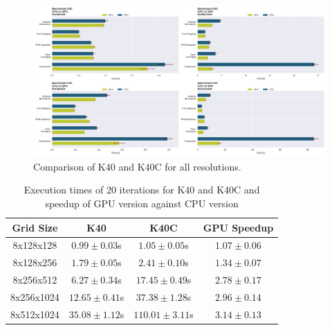 \documentclass[master.tex]{subfiles}
\begin{document}
\begin{figure}[!hbtp]
    \centering
    \includegraphics[width=\linewidth]{pdfs/k40CPUvsGPU_complete_means.pdf}
    \caption{\small Comparison of \ac{K40} and \ac{K40C} for all resolutions.}
    \label{fig:k40_gpu_vs_cpu_complete_means}
\end{figure}

\begin{table}[!hbtp]
    \centering
    \begin{tabular}{c|c|c|c}
        Grid Size & \ac{K40} & \ac{K40C} & GPU Speedup  \\  \hline
        8x128x128 & $0.99 \pm 0.03$s & $1.05 \pm 0.05$s & $1.07 \pm  0.06$ \\
        8x128x256 & $1.79\pm0.05$s & $2.41\pm0.10$s & $1.34\pm0.07$ \\
        8x256x512 & $6.27\pm0.34$s & $17.45\pm0.49$s & $2.78\pm0.17$ \\
        8x256x1024 & $12.65\pm0.41$s & $37.38\pm1.28$s & $2.96\pm0.14$ \\
        8x512x1024 & $35.08\pm1.12$s & $110.01\pm3.11$s & $3.14\pm0.13$
    \end{tabular}
    \caption{Execution times of 20 iterations for \ac{K40} and \ac{K40C} and speedup of GPU version against CPU version}
    \label{tab:talbe_k40_k40c}
\end{table}
\newpage
\end{document}
